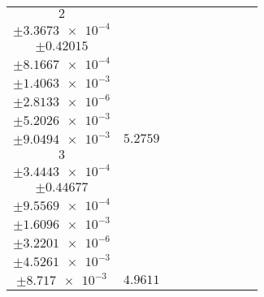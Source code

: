 \documentclass[8pt]{article}
\begin{document}
\begin{longtable}[l]{c c c c c c c c c}
$\num{2}$ & \begin{tabular}[c]{@{}c@{}}$\num{6.1868e-2}$ \\ $\pm\num{3.3673e-4}$\end{tabular} & \begin{tabular}[c]{@{}c@{}}$\num{0.14623}$ \\ $\pm\num{0.42015}$\end{tabular} & \begin{tabular}[c]{@{}c@{}}$\num{-2.437}$ \\ $\pm\num{8.1667e-4}$\end{tabular} & \begin{tabular}[c]{@{}c@{}}$\num{942.25}$ \\ $\pm\num{1.4063e-3}$\end{tabular} & \begin{tabular}[c]{@{}c@{}}$\num{1.885}$ \\ $\pm\num{2.8133e-6}$\end{tabular} & \begin{tabular}[c]{@{}c@{}}$\num{1.181}$ \\ $\pm\num{5.2026e-3}$\end{tabular} & \begin{tabular}[c]{@{}c@{}}$\num{4.1811}$ \\ $\pm\num{9.0494e-3}$\end{tabular} & $\num{5.2759}$\\
$\num{3}$ & \begin{tabular}[c]{@{}c@{}}$\num{5.6121e-2}$ \\ $\pm\num{3.4443e-4}$\end{tabular} & \begin{tabular}[c]{@{}c@{}}$\num{5.0047e-2}$ \\ $\pm\num{0.44677}$\end{tabular} & \begin{tabular}[c]{@{}c@{}}$\num{-2.1376}$ \\ $\pm\num{9.5569e-4}$\end{tabular} & \begin{tabular}[c]{@{}c@{}}$\num{942.63}$ \\ $\pm\num{1.6096e-3}$\end{tabular} & \begin{tabular}[c]{@{}c@{}}$\num{1.8858}$ \\ $\pm\num{3.2201e-6}$\end{tabular} & \begin{tabular}[c]{@{}c@{}}$\num{1.1129}$ \\ $\pm\num{4.5261e-3}$\end{tabular} & \begin{tabular}[c]{@{}c@{}}$\num{4.126}$ \\ $\pm\num{8.717e-3}$\end{tabular} & $\num{4.9611}$\\

\end{longtable}
\end{document}
